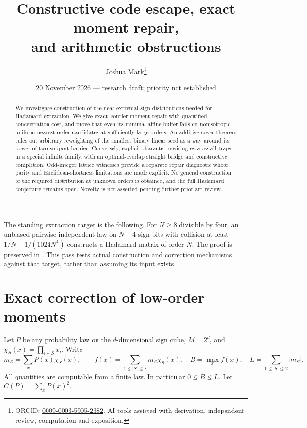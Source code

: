\documentclass[11pt]{article}
\title{Constructive code escape, exact moment repair,\\and arithmetic obstructions}
\author{Joshua Mark\thanks{ORCID: \href{https://orcid.org/0009-0003-5905-2382}{0009-0003-5905-2382}. AI tools assisted with derivation, independent review, computation and exposition.}}
\date{20 November 2026 --- research draft; priority not established}
\begin{document}
\maketitle

\begin{abstract}
We investigate construction of the near-extremal sign distributions
needed for Hadamard extraction. We give exact Fourier moment repair
with quantified concentration cost, and prove that even its minimal
affine buffer fails on nonisotropic uniform nearest-order candidates
at sufficiently large orders. An additive-cover theorem rules out
arbitrary reweighting of the smallest binary linear seed as a way
around its power-of-two support barrier. Conversely, explicit
character rewiring escapes all traps in a special infinite family,
with an optimal-overlap straight bridge and constructive completion.
Odd-integer lattice witnesses provide a separate repair diagnostic
whose parity and Euclidean-shortness limitations are made explicit.
No general construction of the required distribution at unknown
orders is obtained, and the full Hadamard conjecture remains open.
Novelty is not asserted pending further prior-art review.
\end{abstract}
The standing extraction target is the following. For $N\ge8$ divisible
by four, an unbiased pairwise-independent law on $N-4$ sign bits
with collision at least $1/N-1/(1024N^4)$ constructs a Hadamard
matrix of order $N$. The proof is preserved in
. This pass tests actual
construction and correction mechanisms against that target, rather
than assuming its input exists.

\section{Exact correction of low-order moments}

Let $P$ be any probability law on the $d$-dimensional sign cube,
$M=2^d$, and $\chi_S(x)=\prod_{i\in S}x_i$. Write
\[
 m_S=\sum_xP(x)\chi_S(x),\qquad
 f(x)=\sum_{1\le|S|\le2}m_S\chi_S(x),\quad
 B=\max_x f(x),\quad L=\sum_{1\le|S|\le2}|m_S|.
\]
All quantities are computable from a finite law. In particular
$0\le B\le L$. Let $C(P)=\sum_xP(x)^2$.
\end{document}
